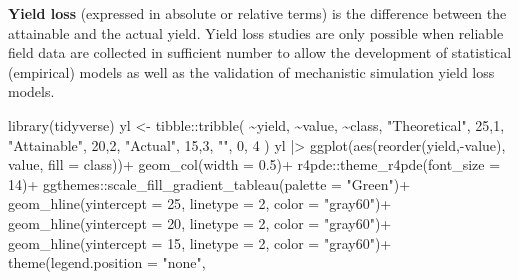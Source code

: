 \documentclass[
  letterpaper,
]{book}
\newenvironment{Shaded}{\begin{snugshade}}{\end{snugshade}}
\newcommand{\AttributeTok}[1]{\textcolor[rgb]{0.40,0.45,0.13}{#1}}
\newcommand{\DecValTok}[1]{\textcolor[rgb]{0.68,0.00,0.00}{#1}}
\newcommand{\FloatTok}[1]{\textcolor[rgb]{0.68,0.00,0.00}{#1}}
\newcommand{\FunctionTok}[1]{\textcolor[rgb]{0.28,0.35,0.67}{#1}}
\newcommand{\NormalTok}[1]{\textcolor[rgb]{0.00,0.23,0.31}{#1}}
\newcommand{\OtherTok}[1]{\textcolor[rgb]{0.00,0.23,0.31}{#1}}
\newcommand{\SpecialCharTok}[1]{\textcolor[rgb]{0.37,0.37,0.37}{#1}}
\newcommand{\StringTok}[1]{\textcolor[rgb]{0.13,0.47,0.30}{#1}}
\begin{document}
\textbf{Yield loss} (expressed in absolute or relative terms) is the
difference between the attainable and the actual yield. Yield loss
studies are only possible when reliable field data are collected in
sufficient number to allow the development of statistical (empirical)
models as well as the validation of mechanistic simulation yield loss
models.

\begin{Shaded}
\begin{Highlighting}[]
\FunctionTok{library}\NormalTok{(tidyverse)}
\NormalTok{yl }\OtherTok{\textless{}{-}}\NormalTok{ tibble}\SpecialCharTok{::}\FunctionTok{tribble}\NormalTok{(}
  \SpecialCharTok{\textasciitilde{}}\NormalTok{yield, }\SpecialCharTok{\textasciitilde{}}\NormalTok{value, }\SpecialCharTok{\textasciitilde{}}\NormalTok{class,}
  \StringTok{"Theoretical"}\NormalTok{, }\DecValTok{25}\NormalTok{,}\DecValTok{1}\NormalTok{,}
  \StringTok{"Attainable"}\NormalTok{, }\DecValTok{20}\NormalTok{,}\DecValTok{2}\NormalTok{,}
  \StringTok{"Actual"}\NormalTok{, }\DecValTok{15}\NormalTok{,}\DecValTok{3}\NormalTok{,}
  \StringTok{""}\NormalTok{, }\DecValTok{0}\NormalTok{, }\DecValTok{4}
\NormalTok{)}
\NormalTok{yl }\SpecialCharTok{|\textgreater{}} 
  \FunctionTok{ggplot}\NormalTok{(}\FunctionTok{aes}\NormalTok{(}\FunctionTok{reorder}\NormalTok{(yield,}\SpecialCharTok{{-}}\NormalTok{value), value, }\AttributeTok{fill =}\NormalTok{ class))}\SpecialCharTok{+}
  \FunctionTok{geom\_col}\NormalTok{(}\AttributeTok{width =} \FloatTok{0.5}\NormalTok{)}\SpecialCharTok{+}
\NormalTok{  r4pde}\SpecialCharTok{::}\FunctionTok{theme\_r4pde}\NormalTok{(}\AttributeTok{font\_size =} \DecValTok{14}\NormalTok{)}\SpecialCharTok{+}
\NormalTok{  ggthemes}\SpecialCharTok{::}\FunctionTok{scale\_fill\_gradient\_tableau}\NormalTok{(}\AttributeTok{palette =} \StringTok{"Green"}\NormalTok{)}\SpecialCharTok{+}
  \FunctionTok{geom\_hline}\NormalTok{(}\AttributeTok{yintercept =} \DecValTok{25}\NormalTok{, }\AttributeTok{linetype =} \DecValTok{2}\NormalTok{, }\AttributeTok{color =} \StringTok{"gray60"}\NormalTok{)}\SpecialCharTok{+}
  \FunctionTok{geom\_hline}\NormalTok{(}\AttributeTok{yintercept =} \DecValTok{20}\NormalTok{, }\AttributeTok{linetype =} \DecValTok{2}\NormalTok{, }\AttributeTok{color =} \StringTok{"gray60"}\NormalTok{)}\SpecialCharTok{+}
  \FunctionTok{geom\_hline}\NormalTok{(}\AttributeTok{yintercept =} \DecValTok{15}\NormalTok{, }\AttributeTok{linetype =} \DecValTok{2}\NormalTok{, }\AttributeTok{color =} \StringTok{"gray60"}\NormalTok{)}\SpecialCharTok{+}
  \FunctionTok{theme}\NormalTok{(}\AttributeTok{legend.position =} \StringTok{"none"}\NormalTok{, }

\end{Highlighting}
\end{Shaded}
\end{document}
